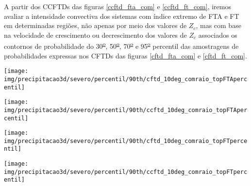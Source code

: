 A partir dos CCFTDs das figuras \ref{ccftd_fta_com} e \ref{ccftd_ft_com}, iremos avaliar a intensidade convectiva dos sistemas com índice extremo de FTA e FT em determinadas regiões, não apenas por meio dos valores de $Z_c$, mas com base na velocidade de crescimento ou decrescimento dos valores de $Z_{c}$ associados os contornos de probabilidade do 30\textsuperscript{\underline{o}}, 50\textsuperscript{\underline{o}}, 70\textsuperscript{\underline{o}} e 95\textsuperscript{\underline{o}} percentil das amostragens de probabilidades expressas nos CFTDs das figuras \ref{cftd_fta_com} e \ref{cftd_ft_com}.	




\begin{sidewaysfigure}%
\centering
\texttt{[image: img/precipitacao3d/severo/percentil/90th/cftd\_10deg\_comraio\_topFTApercentil]}
\caption{CFTDs para os extremos de FTA. Porção da precipitação com raios.}
\label{cftd_fta_com}
\end{sidewaysfigure} 

\begin{sidewaysfigure}%
\centering
\texttt{[image: img/precipitacao3d/severo/percentil/90th/ccftd\_10deg\_comraio\_topFTApercentil]}
\caption{CCFTDs para os extremos de FTA. Porção da precipitação com raios.}
\label{ccftd_fta_com}
\end{sidewaysfigure} 

\begin{sidewaysfigure}%
\centering
\texttt{[image: img/precipitacao3d/severo/percentil/90th/cftd\_10deg\_comraio\_topFTpercentil]}
\caption{CFTDs para os extremos de FT. Porção da precipitação com raios.}
\label{cftd_ft_com}
\end{sidewaysfigure} 

\begin{sidewaysfigure}%
\centering
\texttt{[image: img/precipitacao3d/severo/percentil/90th/ccftd\_10deg\_comraio\_topFTpercentil]}
\caption{CCFTDs para os extremos de FT. Porção da precipitação com raios.}
\label{ccftd_ft_com}
\end{sidewaysfigure} 


